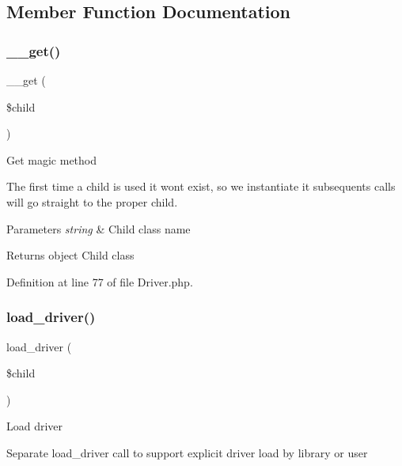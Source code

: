 \subsection{Member Function Documentation}
\mbox{\label{class_c_i___driver___library_a2fac4d4694e05e7eeba5282bd6ff8caf}} 
\subsubsection{\texorpdfstring{\_\_get()}{\_\_get()}}
{\footnotesize\ttfamily \+\_\+\+\_\+get (\begin{DoxyParamCaption}\item[{}]{\$child }\end{DoxyParamCaption})}

Get magic method

The first time a child is used it won\textquotesingle{}t exist, so we instantiate it subsequents calls will go straight to the proper child.


\begin{DoxyParams}{Parameters}
{\em string} & Child class name \\
\hline
\end{DoxyParams}
\begin{DoxyReturn}{Returns}
object Child class 
\end{DoxyReturn}


Definition at line 77 of file Driver.\+php.

\mbox{\label{class_c_i___driver___library_a7cc2908487e106164664ef7d743690b8}} 
\subsubsection{\texorpdfstring{load\_driver()}{load\_driver()}}
{\footnotesize\ttfamily load\+\_\+driver (\begin{DoxyParamCaption}\item[{}]{\$child }\end{DoxyParamCaption})}

Load driver

Separate load\+\_\+driver call to support explicit driver load by library or user


